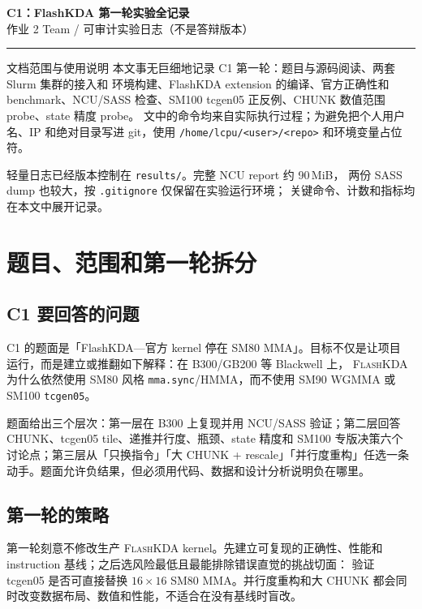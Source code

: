 \documentclass[11pt,a4paper,fontset=none]{ctexart}
\newcommand{\FlashKDA}{\textsc{FlashKDA}}
\newcommand{\code}[1]{\texttt{#1}}
\begin{document}
\begin{center}
  {\LARGE\bfseries C1：FlashKDA 第一轮实验全记录}\\[6pt]
  {\sffamily 作业 2 Team / 可审计实验日志（不是答辩版本）}
\end{center}
\vspace{0.5em}\hrule\vspace{1em}

\begin{record}{文档范围与使用说明}
本文事无巨细地记录 C1 第一轮：题目与源码阅读、两套 Slurm 集群的接入和
环境构建、FlashKDA extension 的编译、官方正确性和 benchmark、NCU/SASS
检查、SM100 tcgen05 正反例、CHUNK 数值范围 probe、state 精度 probe。
文中的命令均来自实际执行过程；为避免把个人用户名、IP 和绝对目录写进
git，使用 \code{/home/lcpu/<user>/<repo>} 和环境变量占位符。

轻量日志已经版本控制在 \code{results/}。完整 NCU report 约 90\,MiB，
两份 SASS dump 也较大，按 \code{.gitignore} 仅保留在实验运行环境；
关键命令、计数和指标均在本文中展开记录。
\end{record}

\tableofcontents
\clearpage

\section{题目、范围和第一轮拆分}

\subsection{C1 要回答的问题}

C1 的题面是「FlashKDA---官方 kernel 停在 SM80 MMA」。目标不仅是让项目
运行，而是建立或推翻如下解释：在 B300/GB200 等 Blackwell 上，
\FlashKDA{} 为什么依然使用 SM80 风格 \code{mma.sync}/HMMA，而不使用
SM90 WGMMA 或 SM100 \code{tcgen05}。

题面给出三个层次：第一层在 B300 上复现并用 NCU/SASS 验证；第二层回答
CHUNK、tcgen05 tile、递推并行度、瓶颈、state 精度和 SM100 专版决策六个
讨论点；第三层从「只换指令」「大 CHUNK + rescale」「并行度重构」任选一条
动手。题面允许负结果，但必须用代码、数据和设计分析说明负在哪里。

\subsection{第一轮的策略}

第一轮刻意不修改生产 \FlashKDA{} kernel。先建立可复现的正确性、性能和
instruction 基线；之后选风险最低且最能排除错误直觉的挑战切面：
验证 tcgen05 是否可直接替换 \(16\times16\) SM80 MMA。并行度重构和大 CHUNK
都会同时改变数据布局、数值和性能，不适合在没有基线时盲改。
\end{document}
